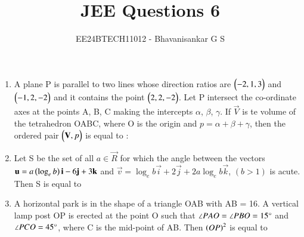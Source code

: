 \documentclass[journal,12pt,onecolumn]{IEEEtran}
\theoremstyle{remark}
\begin{document}

\vspace{3cm}

\title{JEE Questions 6}
\author{EE24BTECH11012 - Bhavanisankar G S}
\maketitle
\newpage
\bigskip

\renewcommand{\thefigure}{\theenumi}
\renewcommand{\thetable}{\theenumi}
\begin{enumerate}
	\item A plane P is parallel to two lines whose direction ratios are $\begin{pmatrix}-2,1,3\end{pmatrix}$ and $\begin{pmatrix}-1,2,-2\end{pmatrix}$ and it contains the point $\begin{pmatrix}2,2,-2\end{pmatrix}$. Let P intersect the co-ordinate axes at the points A, B, C making the intercepts $\alpha$, $\beta$, $\gamma$. If $\vec{V}$ is te volume of the tetrahedron OABC, where O is the origin and $p=\alpha + \beta + \gamma$, then the ordered pair $\begin{pmatrix}\mathbf{V}, p\end{pmatrix}$ is equal to :
		\begin{enumerate}
		\end{enumerate}
	\item Let S be the set of all $ a \in \vec{R}$ for which the angle between the vectors $\mathbf{u} = a\left(\log_{e}{b}\right)\mathbf{i} -6\mathbf{j} + 3\mathbf{k}$ and $\vec{v} = \log_{e}{b}\vec{i} + 2\vec{j} + 2a\log_{e}{b}\vec{k}$, $(b>1)$ is acute. Then S is equal to 
		\begin{enumerate}
				\begin{multicols}{4}
				\item $\brak{-\infty, -\frac{4}{3}}$
				\item $ \phi $
				\item $\brak{-\frac{4}{3}, 0}$
				\item $\brak{\frac{12}{7}, \infty}$
				\end{multicols}
		\end{enumerate}
	\item A horizontal park is in the shape of a triangle OAB with AB = 16. A vertical lamp post OP is erected at the point O such that $\angle{PAO} = \angle{PBO} = 15 \degree$ and $\angle{PCO} = 45\degree$, where C is the mid-point of AB. Then $\left(OP\right)^2$ is equal to 

\end{enumerate}
\end{document}
